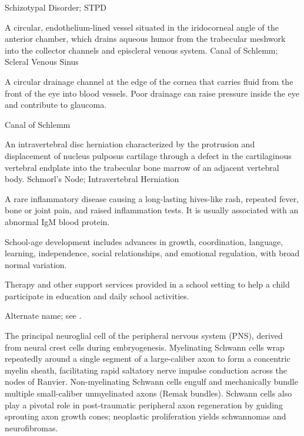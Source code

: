 \synonyms
Schizotypal Disorder; STPD

 A circular, endothelium-lined vessel situated in the iridocorneal angle of the anterior chamber, which drains aqueous humor from the trabecular meshwork into the collector channels and episcleral venous system.
\synonyms
Canal of Schlemm; Scleral Venous Sinus

 A circular drainage channel at the edge of the cornea that carries fluid from the front of the eye into blood vessels. Poor drainage can raise pressure inside the eye and contribute to glaucoma.

\synonyms
Canal of Schlemm

 An intravertebral disc herniation characterized by the protrusion and displacement of nucleus pulposus cartilage through a defect in the cartilaginous vertebral endplate into the trabecular bone marrow of an adjacent vertebral body.
\synonyms
Schmorl's Node; Intravertebral Herniation

 A rare inflammatory disease causing a long-lasting hives-like rash, repeated fever, bone or joint pain, and raised inflammation tests. It is usually associated with an abnormal IgM blood protein.

 School-age development includes advances in growth, coordination, language, learning, independence, social relationships, and emotional regulation, with broad normal variation.

 Therapy and other support services provided in a school setting to help a child participate in education and daily school activities.

 Alternate name; see .

 The principal neuroglial cell of the peripheral nervous system (PNS), derived from neural crest cells during embryogenesis. Myelinating Schwann cells wrap repeatedly around a single segment of a large-caliber axon to form a concentric myelin sheath, facilitating rapid saltatory nerve impulse conduction across the nodes of Ranvier. Non-myelinating Schwann cells engulf and mechanically bundle multiple small-caliber unmyelinated axons (Remak bundles). Schwann cells also play a pivotal role in post-traumatic peripheral axon regeneration by guiding sprouting axon growth cones; neoplastic proliferation yields schwannomas and neurofibromas.

